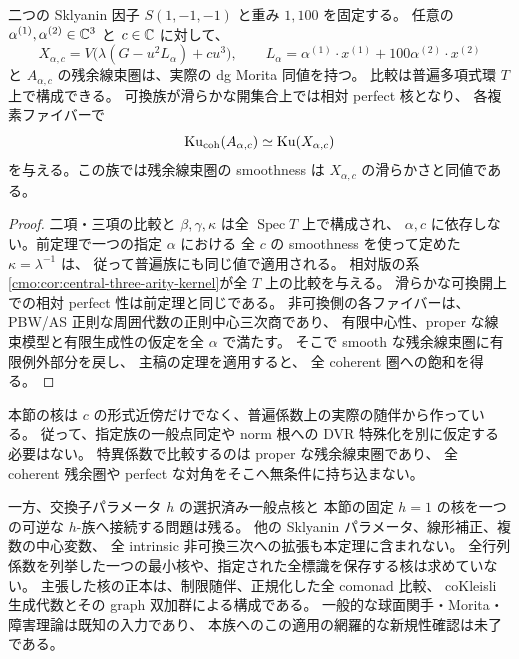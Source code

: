 \begin{corollary}[同じ二ブロックの任意の定数補正]
\label{cmo:cor:all-alpha-central-kernel}
二つの Sklyanin 因子 $S(1,-1,-1)$ と重み $1,100$ を固定する。
任意の $\alpha^{(1)},\alpha^{(2)}\in\mathbb C^3$ と $c\in\mathbb C$ に対して、
\[
 X_{\alpha,c}
 =V\bigl(\lambda(G-u^2L_\alpha)+cu^3\bigr),\qquad
 L_\alpha=\alpha^{(1)}\cdot x^{(1)}
                  +100\alpha^{(2)}\cdot x^{(2)}
\]
と $A_{\alpha,c}$ の残余線束圏は、実際の dg Morita 同値を持つ。
比較は普遍多項式環 $T$ 上で構成できる。
可換族が滑らかな開集合上では相対 perfect 核となり、
各複素ファイバーで
\[
 \operatorname{Ku}_{\mathrm{coh}}(A_{\alpha,c})\simeq\operatorname{Ku}(X_{\alpha,c})
\]
を与える。この族では残余線束圏の smoothness は
$X_{\alpha,c}$ の滑らかさと同値である。
\end{corollary}
\begin{proof}
二項・三項の比較と $\beta,\gamma,\kappa$ は全 $\operatorname{Spec}T$ 上で構成され、
$\alpha,c$ に依存しない。前定理で一つの指定 $\alpha$ における
全 $c$ の smoothness を使って定めた $\kappa=\lambda^{-1}$ は、
従って普遍族にも同じ値で適用される。
相対版の系\ref{cmo:cor:central-three-arity-kernel}が全 $T$ 上の比較を与える。
滑らかな可換開上での相対 perfect 性は前定理と同じである。
非可換側の各ファイバーは、PBW/AS 正則な周囲代数の正則中心三次商であり、
有限中心性、proper な線束模型と有限生成性の仮定を全 $\alpha$ で満たす。
そこで smooth な残余線束圏に有限例外部分を戻し、
主稿の定理を適用すると、
全 coherent 圏への飽和を得る。
\end{proof}

\begin{remark}[比較の範囲と残る課題]
\label{cmo:rem:all-central-kernel-scope}
本節の核は $c$ の形式近傍だけでなく、普遍係数上の実際の随伴から作っている。
従って、指定族の一般点同定や norm 根への DVR 特殊化を別に仮定する必要はない。
特異係数で比較するのは proper な残余線束圏であり、
全 coherent 残余圏や perfect な対角をそこへ無条件に持ち込まない。

一方、交換子パラメータ $h$ の選択済み一般点核と
本節の固定 $h=1$ の核を一つの可逆な $h$-族へ接続する問題は残る。
他の Sklyanin パラメータ、線形補正、複数の中心変数、
全 intrinsic 非可換三次への拡張も本定理に含まれない。
全行列係数を列挙した一つの最小核や、指定された全標識を保存する核は求めていない。
主張した核の正本は、制限随伴、正規化した全 comonad 比較、
coKleisli 生成代数とその graph 双加群による構成である。
一般的な球面関手・Morita・障害理論は既知の入力であり、
本族へのこの適用の網羅的な新規性確認は未了である。
\end{remark}
